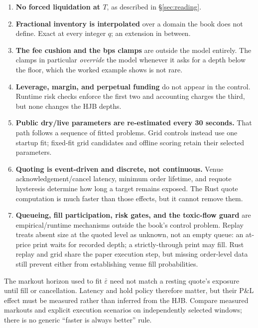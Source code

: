 \documentclass[11pt,a4paper]{article}
\newcommand{\epsb}{\bar{\varepsilon}}
\begin{document}
\begin{enumerate}
  \item \textbf{No forced liquidation at $T$}, as described in
    \S\ref{sec:reading}.
  \item \textbf{Fractional inventory is interpolated} over a domain the book does
    not define. Exact at every integer $q$; an extension in between.
  \item \textbf{The fee cushion and the bps clamps} are outside the model
    entirely. The clamps in particular \emph{override} the model whenever it asks
    for a depth below the floor, which the worked example shows is not rare.
  \item \textbf{Leverage, margin, and perpetual funding} do not appear in the
    control. Runtime risk checks enforce the first two and accounting charges the
    third, but none changes the HJB depths.
  \item \textbf{Public dry/live parameters are re-estimated every 30 seconds.}
    That path follows a sequence of fitted problems. Grid controls instead use
    one startup fit; fixed-fit grid candidates and offline scoring retain their
    selected parameters.
  \item \textbf{Quoting is event-driven and discrete, not continuous.} Venue
    acknowledgement/cancel latency, minimum order lifetime, and requote
    hysteresis determine how long a target remains exposed. The Rust quote
    computation is much faster than those effects, but it cannot remove them.
  \item \textbf{Queueing, fill participation, risk gates, and the toxic-flow
    guard} are empirical/runtime mechanisms outside the book's control problem.
    Replay treats absent size at the quoted level as unknown, not an empty queue:
    an at-price print waits for recorded depth; a strictly-through print may fill.
    Rust replay and grid share the paper execution step, but missing order-level
    data still prevent either from establishing venue fill probabilities.
\end{enumerate}

\begin{intuition}
The markout horizon used to fit $\epsb$ need not match a resting quote's exposure
until fill or cancellation. Latency and hold policy therefore matter, but their
P\&L effect must be measured rather than inferred from the HJB. Compare measured
markouts and explicit execution scenarios on independently selected windows;
there is no generic ``faster is always better'' rule.
\end{intuition}
\end{document}
